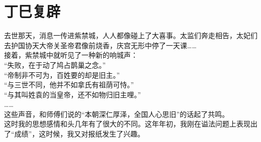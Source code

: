 \fancyhead[RO]{} %
\fancyhead[LE]{} %
\chapter*{丁巳复辟}
\thispagestyle{empty}
去世那天，消息一传进紫禁城，人人都像碰上了大喜事。太监们奔走相告，太妃们去护国协天大帝关圣帝君像前烧香，庆宫无形中停了一天课……\\

接着，紫禁城中就听见了一种新的响城声：\\

“失败，在于动了鸠占鹊巢之念。”\\

“帝制非不可为，百姓要的却是旧主。”\\

“与三世不同，他并不如拿氏有祖荫可恃。”\\

“与其叫姓袁的当皇帝，还不如物归旧主哩。”\\

……\\

这些声音，和师傅们说的“本朝深仁厚泽，全国人心思旧”的话起了共鸣。\\

这时我的思想感情和头几年有了很大的不同。这年年初，我刚在谥法问题上表现出了“成绩”，这时候，我又对报纸发生了兴趣。\\

